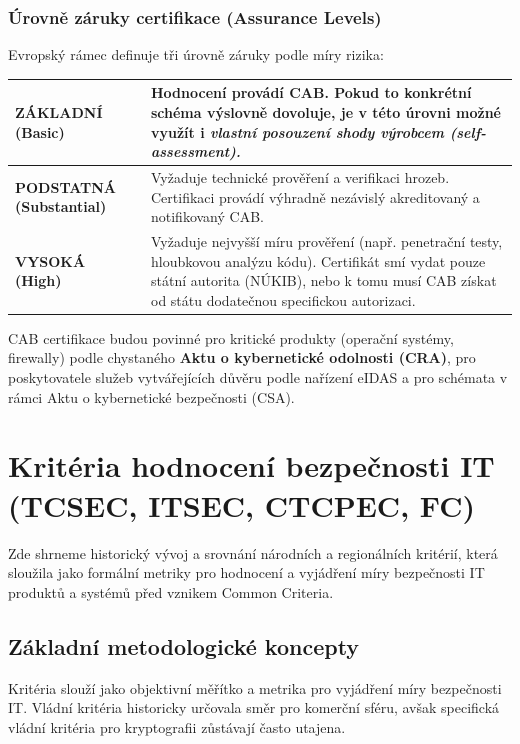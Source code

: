 \documentclass[10pt,a4paper]{article}
\begin{document}
	\subsubsection*{Úrovně záruky certifikace (Assurance Levels)}
	Evropský rámec definuje tři úrovně záruky podle míry rizika:
	\begin{center}
		\small
		\begin{tabular}{|l|p{10.0cm}|}
			\hline
			\textbf{ZÁKLADNÍ (Basic)} & Hodnocení provádí CAB. 
			Pokud to konkrétní schéma výslovně dovoluje, je v této úrovni možné využít i \textit{vlastní posouzení shody výrobcem (self-assessment).} \\ \hline
			\textbf{PODSTATNÁ (Substantial)} & Vyžaduje technické prověření a verifikaci hrozeb. Certifikaci provádí výhradně nezávislý akreditovaný a notifikovaný CAB. \\ \hline
			\textbf{VYSOKÁ (High)} & Vyžaduje nejvyšší míru prověření (např. penetrační testy, hloubkovou analýzu kódu). 
			Certifikát smí vydat pouze státní autorita (NÚKIB), nebo k tomu musí CAB získat od státu dodatečnou specifickou autorizaci. \\ \hline
		\end{tabular}
	\end{center}


	CAB certifikace budou povinné pro kritické produkty (operační systémy, firewally) podle chystaného \textbf{Aktu o kybernetické odolnosti (CRA)}, pro poskytovatele služeb vytvářejících důvěru podle nařízení eIDAS a pro schémata v rámci Aktu o kybernetické bezpečnosti (CSA).	
	
	\section{Kritéria hodnocení bezpečnosti IT (TCSEC, ITSEC, CTCPEC, FC)}
	
	Zde shrneme historický vývoj a srovnání národních a regionálních kritérií, která sloužila jako formální metriky pro hodnocení a vyjádření míry bezpečnosti IT produktů a systémů před vznikem Common Criteria.
	
	\subsection{Základní metodologické koncepty}
	Kritéria slouží jako objektivní měřítko a metrika pro vyjádření míry bezpečnosti IT. 
	Vládní kritéria historicky určovala směr pro komerční sféru, avšak specifická vládní kritéria pro kryptografii zůstávají často utajena.
	
\end{document}

